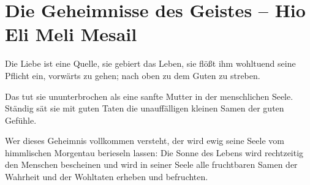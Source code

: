 \raggedbottom
		
        \chapter{Die Geheimnisse des Geistes -- Hio Eli Meli Mesail}
     
\vspace{1em}
        \begin{center}
            \normalfont\scshape\large{}
        \end{center}
        
        \vspace{1em}
        
        \begin{center}
            \normalfont\scshape{} 
          
        \end{center}

        \vspace{1em}

        \begin{center}
            \normalfont\scshape\large{} 
        \end{center}
        
        \vspace{2em}
        
        Die Liebe ist eine Quelle, sie gebiert das Leben, sie flößt ihm wohltuend seine Pflicht ein, vorwärts zu gehen; nach oben zu dem Guten zu streben.
        
        Das tut sie ununterbrochen als eine sanfte Mutter in der menschlichen Seele. Ständig sät sie mit guten Taten die unauffälligen kleinen Samen der guten Gefühle.
        
        Wer dieses Geheimnis vollkommen versteht, der wird ewig seine Seele vom himmlischen Morgentau berieseln lassen: Die Sonne des Lebens wird rechtzeitig den Menschen bescheinen und wird in seiner Seele alle fruchtbaren Samen der Wahrheit und der Wohltaten erheben und befruchten. 

\newpage

        \begin{center}
            \normalfont\scshape\large{}
        \end{center}

        \begin{center}
            \normalfont\scshape{}
        \end{center}
        
